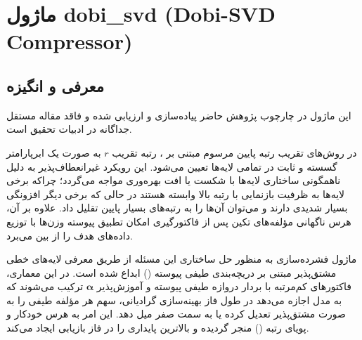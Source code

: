 \section{ماژول dobi\_svd (Dobi-SVD Compressor)}
\label{sec:module_dobi_svd}

\subsection{معرفی و انگیزه}
این ماژول در چارچوب پژوهش حاضر پیاده‌سازی و ارزیابی شده و فاقد مقاله مستقل جداگانه در ادبیات تحقیق است.

در روش‌های تقریب رتبه پایین مرسوم مبتنی بر ، رتبه تقریب $r$ به صورت یک ابرپارامتر گسسته و ثابت در تمامی لایه‌ها تعیین می‌شود. این رویکرد غیرانعطاف‌پذیر به دلیل ناهمگونی ساختاری لایه‌ها با شکست یا افت بهره‌وری مواجه می‌گردد؛ چراکه برخی لایه‌ها به ظرفیت بازنمایی با رتبه بالا وابسته هستند در حالی که برخی دیگر افزونگی بسیار شدیدی دارند و می‌توان آن‌ها را به رتبه‌های بسیار پایین تقلیل داد. علاوه بر آن، هرس ناگهانی مؤلفه‌های تکین پس از فاکتورگیری امکان تطبیق پیوسته وزن‌ها با توزیع داده‌های هدف را از بین می‌برد.

ماژول فشرده‌سازی  به منظور حل ساختاری این مسئله از طریق معرفی لایه‌های خطی مشتق‌پذیر مبتنی بر دریچه‌بندی طیفی پیوسته () ابداع شده است. در این معماری، فاکتورهای کم‌مرتبه با بردار دروازه طیفی پیوسته و آموزش‌پذیر $\boldsymbol{\alpha}$ ترکیب می‌شوند که به مدل اجازه می‌دهد در طول فاز بهینه‌سازی گرادیانی، سهم هر مؤلفه طیفی را به صورت مشتق‌پذیر تعدیل کرده یا به سمت صفر میل دهد. این امر به هرس خودکار و پویای رتبه () منجر گردیده و بالاترین پایداری را در فاز بازیابی ایجاد می‌کند.

